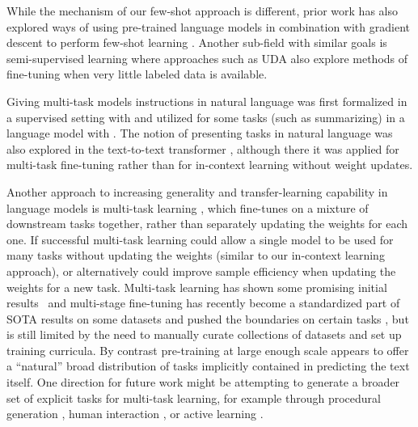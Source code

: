 \documentclass{article}
\begin{document}
While the mechanism of our few-shot approach is different, prior work has also explored ways of using pre-trained language models in combination with gradient descent to perform few-shot learning \cite{schick2020exploiting}. Another sub-field with similar goals is semi-supervised learning where approaches such as UDA \cite{xie2019unsupervised} also explore methods of fine-tuning when very little labeled data is available.

Giving multi-task models instructions in natural language was first formalized in a supervised setting with \cite{mccann2018natural} and utilized for some tasks (such as summarizing) in a language model with \cite{radford2019language}.  The notion of presenting tasks in natural language was also explored in the text-to-text transformer  \cite{raffel2019t5}, although there it was applied for multi-task fine-tuning rather than for in-context learning without weight updates.

Another approach to increasing generality and transfer-learning capability in language models is multi-task learning \cite{caruana1997multitask}, which fine-tunes on a mixture of downstream tasks together, rather than separately updating the weights for each one.  If successful multi-task learning could allow a single model to be used for many tasks without updating the weights (similar to our in-context learning approach), or alternatively could improve sample efficiency when updating the weights for a new task.  Multi-task learning has shown some promising initial results~\citep{liu2015representation, liu2018generating} and multi-stage fine-tuning has recently become a standardized part of SOTA results on some datasets \cite{phang2018sentence} and pushed the boundaries on certain tasks \cite{khashabi2020unifiedqa}, but is still limited by the need to manually curate collections of datasets and set up training curricula.  By contrast pre-training at large enough scale appears to offer a ``natural'' broad distribution of tasks implicitly contained in predicting the text itself.  One direction for future work might be attempting to generate a broader set of explicit tasks for multi-task learning, for example through procedural generation \cite{tobin2017domain}, human interaction \cite{Ziegler2019FineTuningLM}, or active learning \cite{mackay1992active}.
\end{document}

